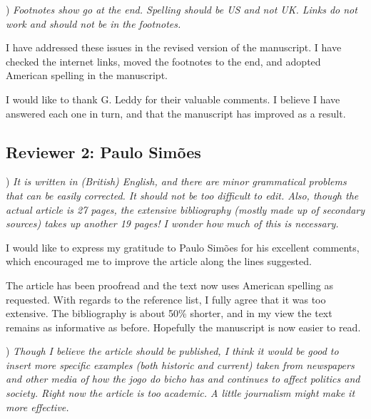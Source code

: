 \documentclass[a4paper,12pt]{article}
\begin{document}
) \textit{Footnotes show go at the end. Spelling should be US and not UK. Links do not work and should not be in the footnotes.}

\vspace{.25cm}

I have addressed these issues in the revised version of the manuscript. I have checked the internet links, moved the footnotes to the end, and adopted American spelling in the manuscript.

\vspace{.5cm}

I would like to thank G. Leddy for their valuable comments. I believe I have answered each one in turn, and that the manuscript has improved as a result.


\newpage 

\subsection*{Reviewer 2: Paulo Simões} %
\label{sub:reviewer_2_paulo_simoes}

) \textit{It is written in (British) English, and there are minor grammatical problems that can be easily corrected. It should not be too difficult to edit. Also, though the actual article is 27 pages, the extensive bibliography (mostly made up of secondary sources) takes up another 19 pages! I wonder how much of this is necessary.}

\vspace{.25cm}

I would like to express my gratitude to Paulo Simões for his excellent comments, which encouraged me to improve the article along the lines suggested.

The article has been proofread and the text now uses American spelling as requested. With regards to the reference list, I fully agree that it was too extensive. The bibliography is about 50\% shorter, and in my view the text remains as informative as before. Hopefully the manuscript is now easier to read.

\vspace{.5cm}

) \textit{Though I believe the article should be published, I think it would be good to insert more specific examples (both historic and current) taken from newspapers and other media of how the jogo do bicho has and continues to affect politics and society. Right now the article is too academic. A little journalism might make it more effective.}
\end{document}
